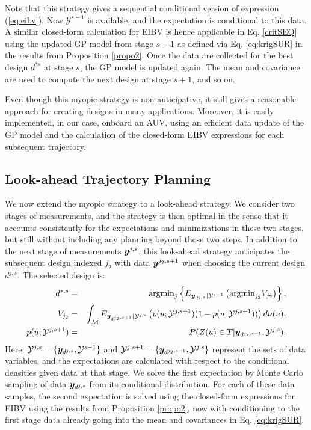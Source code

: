\documentclass[aoas]{imsart}
\begin{document}
Note that this strategy gives a sequential conditional version of
expression (\ref{eq:eibv}). Now $\mathcal{Y}^{s-1}$ is available, and
the expectation is conditional to this data. A similar closed-form
calculation for EIBV is hence applicable in Eq.  \eqref{critSEQ} using the updated
GP model from stage $s-1$ as defined via Eq. \eqref{eq:krigSUR} in the results from Proposition \ref{propo2}. Once the data are collected for the best design $d^{*s}$ at stage $s$, the GP model is updated again. The mean and covariance are used to compute the next design at stage $s+1$, and so on.

Even though this myopic strategy is non-anticipative, it still gives a
reasonable approach for creating designs in many
applications. Moreover, it is easily implemented, in our case, onboard
an AUV, using an efficient data update of the GP model and the
calculation of the closed-form EIBV expressions for each subsequent
trajectory.


\subsection{Look-ahead Trajectory Planning}
\label{sec:LA}

We now extend the myopic strategy to a look-ahead strategy. We consider two stages of
measurements, and the strategy is then optimal in the sense that it accounts consistently for the expectations and minimizations in these two stages, but still without including any planning beyond those two steps. In addition to the
next stage of measurements ${\boldsymbol y}^{j,s}$, this look-ahead strategy anticipates the subsequent design indexed $j_2$ with data
${\boldsymbol y}^{j_2,s+1}$ when choosing the current design $d^{j,s}$. The
selected design is:
\begin{eqnarray}\label{critLA}
    d^{*,s} &=& \mbox{argmin}_{j} \left\{ E_{\by_{d^{j,s}}|\mathcal{Y}^{s-1}} \left( \mbox{argmin}_{j_2}  V_{j_2} \right) \right\}, \\
V_{j_2} & = & \int_{\mathcal{M}} E_{\by_{d^{j_2,s+1}}|\mathcal{Y}^{j,s}} \left( p(\x;\mathcal{Y}^{j,s+1}) ( 1-p(\x;\mathcal{Y}^{j,s+1}) ) \right) d\mes(u), \nonumber \\
    p(\x;\mathcal{Y}^{j,s+1}) &=& P(Z(\x) \in T |\by_{d^{j_2,s+1}},\mathcal{Y}^{j,s}). \nonumber
\end{eqnarray}
Here, $\mathcal{Y}^{j,s}=\{{\boldsymbol y}_{d^{j,s}},\mathcal{Y}^{s-1}\}$ and
$\mathcal{Y}^{j,s+1}=\{{\boldsymbol y}_{d^{j_2,s+1}},\mathcal{Y}^{j,s}\}$
represent the sets of data variables, and the expectations are
calculated with respect to the conditional densities given data at
that stage.  We solve the first expectation by Monte
Carlo sampling of data ${\boldsymbol y}_{d^{j,s}}$ from its conditional
distribution. For each of these data samples, the second expectation
is solved using the closed-form expressions for EIBV using the results from Proposition \ref{propo2}, now with conditioning to the first stage data already going into the mean and covariances in Eq. \eqref{eq:krigSUR}. 
\end{document}
